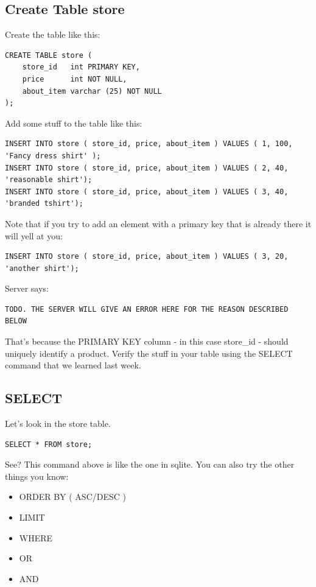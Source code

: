 \documentclass[12pt,a4paper]{article}
\begin{document}
\subsection{Create Table store}
Create the table like this:
\begin{lstlisting}
CREATE TABLE store (
	store_id   int PRIMARY KEY,
	price      int NOT NULL,
	about_item varchar (25) NOT NULL
);
\end{lstlisting}

Add some stuff to the table like this:

\begin{lstlisting}
INSERT INTO store ( store_id, price, about_item ) VALUES ( 1, 100, 'Fancy dress shirt' );
INSERT INTO store ( store_id, price, about_item ) VALUES ( 2, 40, 'reasonable shirt');
INSERT INTO store ( store_id, price, about_item ) VALUES ( 3, 40, 'branded tshirt');
\end{lstlisting}

Note that if you try to add an element with a primary key that is already there it will yell at you:
\begin{lstlisting}
INSERT INTO store ( store_id, price, about_item ) VALUES ( 3, 20, 'another shirt');
\end{lstlisting}

Server says:
\begin{verbatim}
TODO. THE SERVER WILL GIVE AN ERROR HERE FOR THE REASON DESCRIBED BELOW
\end{verbatim}

That's because the PRIMARY KEY column - in this case store\_id - should uniquely
identify a product. Verify the stuff in your table using the SELECT command that
we learned last week.

\subsection{SELECT}
Let's look in the store table.

\begin{lstlisting}
SELECT * FROM store;
\end{lstlisting}

See? This command above is like the one in sqlite. You can also try the other
things you know:

\begin{itemize}
\item ORDER BY ( ASC/DESC )
\item LIMIT
\item WHERE
\item OR
\item AND
\end{itemize}
\end{document}
